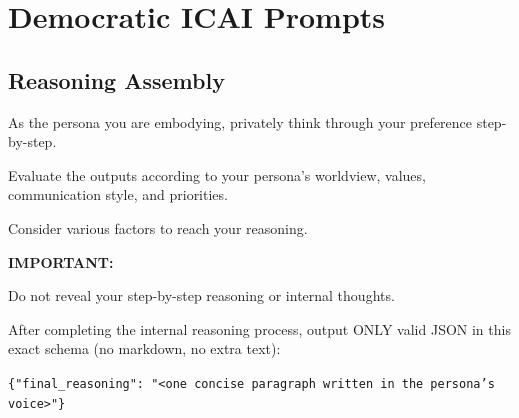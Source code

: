 \section{Democratic ICAI Prompts}
\label{app:dicai_prompts}
\subsection{Reasoning Assembly}
\begin{tcolorbox}[
  enhanced jigsaw,
  breakable,
  colback=blue!5!white,
  colframe=blue!75!black,
  title={Chain of Thought Prompt},
  rounded corners
]
\noindent
As the persona you are embodying, privately think through your preference step-by-step.

\vspace{0.5em}

\noindent
Evaluate the outputs according to your persona's worldview, values, communication style, and priorities.

\vspace{0.5em}

\noindent
Consider various factors to reach your reasoning.

\vspace{1em}

\noindent
\textbf{IMPORTANT:}

\vspace{0.5em}

\noindent
Do not reveal your step-by-step reasoning or internal thoughts.

\vspace{0.5em}

\noindent
After completing the internal reasoning process, output ONLY valid JSON in this exact schema (no markdown, no extra text):

\vspace{1em}

\noindent
\texttt{\{"final\_reasoning": "\textless{}one concise paragraph written in the persona's voice\textgreater{}"\}}
\end{tcolorbox}
\noindent\begin{minipage}{\textwidth}
\label{cot_strategy}
\end{minipage}


